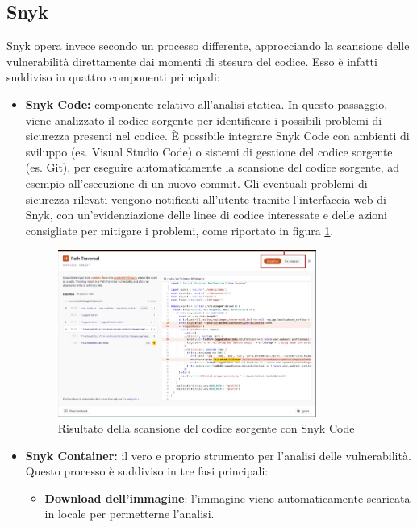 \subsection{Snyk}
Snyk opera invece secondo un processo differente, approcciando la scansione delle vulnerabilità direttamente dai momenti di stesura del codice. Esso è infatti suddiviso in quattro componenti principali:
\begin{itemize}
   \item \textbf{Snyk Code:} componente relativo all'analisi statica. In questo passaggio, viene analizzato il codice sorgente per identificare i possibili problemi di sicurezza presenti nel codice. È possibile integrare Snyk Code con ambienti di sviluppo (es. Visual Studio Code) o sistemi di gestione del codice sorgente (es. Git), per eseguire automaticamente la scansione del codice sorgente, ad esempio all'esecuzione di un nuovo commit. Gli eventuali problemi di sicurezza rilevati vengono notificati all'utente tramite l'interfaccia web di Snyk, con un'evidenziazione delle linee di codice interessate e delle azioni consigliate per mitigare i problemi, come riportato in figura \ref{fig:snyk_code}.
         \begin{figure}[H]
            \centering
            \includegraphics[width=0.8\textwidth]{immagini/capitolo1/snyk_code.jpg}
            \caption{Risultato della scansione del codice sorgente con Snyk Code}
            \label{fig:snyk_code}
         \end{figure}
   \item \textbf{Snyk Container:} il vero e proprio strumento per l'analisi delle vulnerabilità. Questo processo è suddiviso in tre fasi principali:
         \begin{itemize}
            \item \textbf{Download dell'immagine}: l'immagine viene automaticamente scaricata in locale per permetterne l'analisi.

\end{itemize}
\end{itemize}
